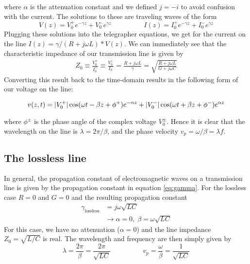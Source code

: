 where $\alpha$ is the attenuation constant and we defined $j=-i$ to avoid confusion with the current. The solutions to these are traveling waves of the form
\begin{equation}
V(z) = V_0^+e^{-\gamma z} + V_0^-e^{\gamma z} \hspace{2cm} I(z) = I_0^+e^{-\gamma z} + I_0^-e^{\gamma z}
\label{eq:telegraph:solution}
\end{equation}
Plugging these solutions into the telegrapher equations, we get for the current on the line $I(z)=\gamma/(R+j\omega L) * V(z)$. We can immediately see that the characteristic impedance of our transmission line is given by
\begin{align}
Z_0 \equiv \frac{V_0^+}{I_0^+}\equiv \frac{V_0^-}{I_0^-}= \frac{R+j\omega L}{\gamma} = \sqrt{\frac{R+j\omega L}{G + j\omega C}}
\end{align}
Converting this result back to the time-domain results in the following form of our voltage on the line:

\begin{align}
v(z,t) = \lvert V_0^+\rvert\cos(\omega t-\beta z+\phi^+)e^{-\alpha z} + \lvert V_0^-\rvert\cos(\omega t+\beta z+\phi^-)e^{\alpha z}
\end{align}

where $\phi^{\pm}$ is the phase angle of the complex voltage $V_0^{\pm}$. Hence it is clear that the wavelength on the line is $\lambda=2\pi/\beta$, and the phase velocity $v_p=\omega/\beta=\lambda f$.
\subsection{The lossless line}
In general, the propagation constant of electromagnetic waves on a transmission line is given by the propagation constant in equation \ref{eq:gamma}. For the lossless case $R=0$ and $G=0$ and the resulting propagation constant
\begin{align}
\gamma_\mathrm{lossless} &= j\omega\sqrt{LC} \\%
&\rightarrow \alpha=0, \; \beta=\omega\sqrt{LC}
\end{align}
For this case, we have no attenuation ($\alpha=0$) and the line impedance $Z_0=\sqrt{L/C}$ is real. The wavelength and frequency are then simply given by
\begin{equation}
\lambda = \frac{2\pi}{\beta} = \frac{2\pi}{\sqrt{LC}} \hspace{2cm} v_p=\frac{\omega}{\beta}=\frac{1}{\sqrt{LC}}
\end{equation}

